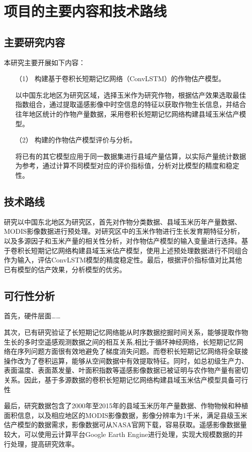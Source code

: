 \section{项目的主要内容和技术路线}

\subsection{主要研究内容}

\par 本研究主要开展如下内容：
\begin{itemize}
  \item [（1）] 构建基于卷积长短期记忆网络（ConvLSTM）的作物估产模型。
  \par 以中国东北地区为研究区域，选择玉米作为研究作物，根据估产效果选取最佳指数组合，通过提取遥感影像中时空信息的特征以获取作物生长信息，并结合往年地区统计的作物产量数据，采用卷积长短期记忆网络构建县域玉米估产模型。
  \item [（2）] 构建的作物估产模型评价与分析。
  \par 将已有的其它模型应用于同一数据集进行县域产量估算，以实际产量统计数据为参考，通过计算不同模型对应的评价指标值，分析对比模型的精度和稳定性。
\end{itemize}

\subsection{技术路线}
研究以中国东北地区为研究区，首先对作物分类数据、县域玉米历年产量数据、MODIS影像数据进行预处理。对研究区中的玉米作物进行生长发育期特征分析，以及多源因子和玉米产量的相关性分析，对作物估产模型的输入变量进行选择。基于卷积长短期记忆网络构建县域玉米估产模型，使用上述预处理数据进行不同组合作为输入，评估ConvLSTM模型的精度稳定性。最后，根据评价指标值对比其他已有模型的估产效果，分析模型的优劣。

\subsection{可行性分析}
\par 首先，硬件层面……
\par 其次，已有研究验证了长短期记忆网络能从时序数据挖掘时间关系，能够提取作物生长的多时空遥感观测数据之间的相互关系,相比于循环神经网络，长短期记忆网络在序列问题方面很有效地避免了梯度消失问题。而卷积长短期记忆网络将全联接操作改为了卷积运算，能够从空间数据中有效提取特征。同时，如总初级生产力、表面温度、表面蒸发量、叶面积指数等遥感影像数据已被证明与农作物产量有密切关系。因此，基于多源数据的卷积长短期记忆网络构建县域玉米估产模型具备可行性
\par 最后，研究数据包含了2000年至2015年的县域玉米历年产量数据、作物物候和种植面积信息，以及相应地区的MODIS影像数据，影像分辨率为1千米，满足县级玉米估产模型的数据需求，影像数据可从NASA官网下载，容易获取。遥感影像数据量较大，可以使用云计算平台Google Earth Engine进行处理，实现大规模数据的并行处理，提高研究效率。